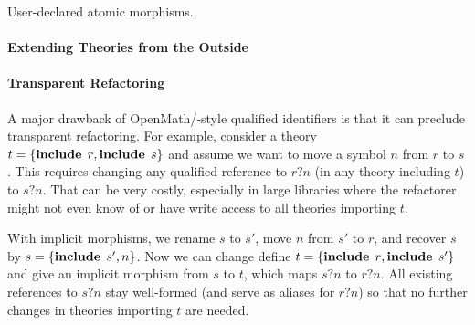 User-declared atomic morphisms.

\paragraph{Extending Theories from the Outside}

\paragraph{Transparent Refactoring}
A major drawback of OpenMath/\mmt-style qualified identifiers is that it can preclude transparent refactoring.
For example, consider a theory $t=\{\operatorname{\mathbf{include}}{\;r},\operatorname{\mathbf{include}}{\;s}\}$ and assume we want to move a symbol $n$ from $r$ to $s$.
This requires changing any qualified reference to $r?n$ (in any theory including $t$) to $s?n$.
That can be very costly, especially in large libraries where the refactorer might not even know of or have write access to all theories importing $t$.

With implicit morphisms, we rename $s$ to $s'$, move $n$ from $s'$ to $r$, and recover $s$ by $s=\{\operatorname{\mathbf{include}}{\;s'},n\}$.
Now we can change define $t=\{\operatorname{\mathbf{include}}{\;r},\operatorname{\mathbf{include}}{\;s'}\}$ and give an implicit morphism from $s$ to $t$, which maps $s?n$ to $r?n$.
All existing references to $s?n$ stay well-formed (and serve as aliases for $r?n$) so that no further changes in theories importing $t$ are needed.
